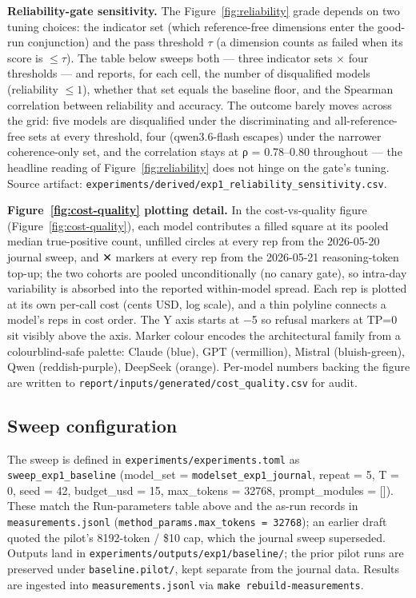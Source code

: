 \documentclass[a4paper,11pt]{article}
\begin{document}
\textbf{Reliability-gate sensitivity.} The Figure~\ref{fig:reliability}
grade depends on two tuning choices: the indicator set (which
reference-free dimensions enter the good-run conjunction) and the pass
threshold \(\tau\) (a dimension counts as failed when its score is
\(\leq \tau\)). The table below sweeps both --- three indicator sets ×
four thresholds --- and reports, for each cell, the number of
disqualified models (reliability \(\leq 1\)), whether that set equals
the baseline floor, and the Spearman correlation between reliability and
accuracy. The outcome barely moves across the grid: five models are
disqualified under the discriminating and all-reference-free sets at
every threshold, four (qwen3.6-flash escapes) under the narrower
coherence-only set, and the correlation stays at ρ = 0.78--0.80
throughout --- the headline reading of Figure~\ref{fig:reliability} does
not hinge on the gate's tuning. Source artifact:
\texttt{experiments/derived/exp1\_reliability\_sensitivity.csv}.

\begin{center}

\end{center}

\textbf{Figure~\ref{fig:cost-quality} plotting detail.} In the
cost-vs-quality figure (Figure~\ref{fig:cost-quality}), each model
contributes a filled square at its pooled median true-positive count,
unfilled circles at every rep from the 2026-05-20 journal sweep, and ✕
markers at every rep from the 2026-05-21 reasoning-token top-up; the two
cohorts are pooled unconditionally (no canary gate), so intra-day
variability is absorbed into the reported within-model spread. Each rep
is plotted at its own per-call cost (cents USD, log scale), and a thin
polyline connects a model's reps in cost order. The Y axis starts at −5
so refusal markers at TP=0 sit visibly above the axis. Marker colour
encodes the architectural family from a colourblind-safe palette: Claude
(blue), GPT (vermillion), Mistral (bluish-green), Qwen (reddish-purple),
DeepSeek (orange). Per-model numbers backing the figure are written to
\texttt{report/inputs/generated/cost\_quality.csv} for audit.

\subsection*{Sweep configuration}

The sweep is defined in \texttt{experiments/experiments.toml} as
\texttt{sweep\_exp1\_baseline} (model\_set =
\texttt{modelset\_exp1\_journal}, repeat = 5, T = 0, seed = 42,
budget\_usd = 15, max\_tokens = 32768, prompt\_modules = {[}{]}). These
match the Run-parameters table above and the as-run records in
\texttt{measurements.jsonl}
(\texttt{method\_params.max\_tokens\ =\ 32768}); an earlier draft quoted
the pilot's 8192-token / \$10 cap, which the journal sweep superseded.
Outputs land in \texttt{experiments/outputs/exp1/baseline/}; the prior
pilot runs are preserved under \texttt{baseline.pilot/}, kept separate
from the journal data. Results are ingested into
\texttt{measurements.jsonl} via \texttt{make\ rebuild-measurements}.
\end{document}
